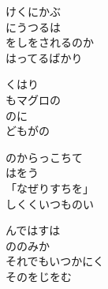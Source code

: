 \documentclass[10pt,b5j]{tarticle} %
\begin{document}
\begin{enumerate}
\begin{minipage}[c]{\blocksize}
    \end{minipage}
    \begin{minipage}[c]{\blocksize}

        \vspace{\linespace}
        \item
        けくにかぶ\\
        にうつるは\\
        をしをされるのか\\
        はってるばかり
        
        \vspace{\linespace}
        \item
        くはり\\
        もマグロの\\
        のに\\
        どもがの
        
        \vspace{\linespace}
        \item
        のからっこちて\\
        はをう\\
        「なぜりすちを」\\
        しくくいつものい
        
        \vspace{\linespace}
        \item
        んではすは\\
        ののみか\\
        それでもいつかにく\\
        そのをじをむ
        
    \end{minipage}
    \begin{minipage}[c]{\blocksize}
        

\end{minipage}
\end{enumerate}
\end{document}

